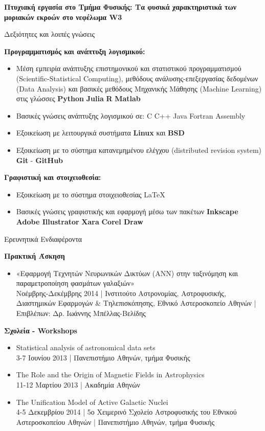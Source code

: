 \documentclass[a4paper,12pt,final]{memoir}
\newcommand{\SmallSep}{\vspace{0.25em}}
\newcommand{\CVSection}[1]
	{\Large{#1}\par
	\SmallSep\normalsize\normalfont}
\newcommand{\CVItem}[2]
	{\textbf{\color{RoyalBlue} #1} #2}
\newcommand{\location}[1]{ %
\small{\color{headings}#1}}
\newenvironment{tightitemize} %
{\vspace{-\topsep}\begin{itemize}\itemsep1pt \parskip0pt \parsep0pt}
{\end{itemize}\vspace{-\topsep}}
\begin{document}
\CVItem{Πτυχιακή εργασία στο Τμήμα Φυσικής: Τα φυσικά χαρακτηριστικά των μοριακών εκροών στο νεφέλωμα W3 \newline}
\location{}
\SmallSep


\CVSection{Δεξιότητες και λοιπές γνώσεις}
\CVItem{Προγραμματισμός και ανάπτυξη λογισμικού:}{}
\begin{tightitemize}
\item Μέση εμπειρία ανάπτυξης επιστημονικού και στατιστικού προγραμματισμού (Scientific-Statistical Computing), μεθόδους ανάλυσης-επεξεργασίας δεδομένων (Data Analysis) και βασικές μεθόδους Μηχανικής Μάθησης (Machine Learning) στις γλώσσες \textbf{Python} \textbullet{} \textbf{Julia} \textbullet{} \textbf{R} \textbullet{} \textbf{Matlab}
\item Βασικές γνώσεις ανάπτυξης λογισμικού σε: C \textbullet{} C++ \textbullet{} Java \textbullet{} Fortran \textbullet{} Assembly 
\item Εξοικείωση με λειτουργικά συστήματα \textbf{Linux} και \textbf{BSD}
\item Εξοικείωση με το σύστημα κατανεμημένου ελέγχου (distributed revision system) \textbf{Git} - \textbf{GitHub}
\end{tightitemize}

\CVItem{Γραφιστική και στοιχειοθεσία:}{}
\begin{tightitemize}
\item Εξοικείωση με το σύστημα στοιχειοθεσίας \LaTeX\
\item Βασικές γνώσεις γραφιστικής και εφαρμογή μέσω των πακέτων \textbf{Inkscape} \textbullet{} \textbf{Adobe Illustrator} \textbullet{} \textbf{Xara} \textbullet{} \textbf{Corel Draw}
\end{tightitemize}
\SmallSep

\CVSection{Ερευνητικά Ενδιαφέροντα}
\CVItem{Πρακτική Άσκηση}{}
\begin{tightitemize}
	\item «Εφαρμογή Τεχνητών Νευρωνικών Δικτύων (ANN) στην ταξινόμηση και παραμετροποίηση φασμάτων γαλαξιών» \\
	\location{Νοέμβρης-Δεκέμβρης 2014 | Ινστιτούτο Αστρονομίας, Αστροφυσικής, Διαστημικών Εφαρμογών \& Τηλεπισκόπησης, Εθνικό Αστεροσκοπείο Αθηνών | Επιβλέπων: Δρ. Ιωάννης Μπέλλας-Βελίδης}
\end{tightitemize}
\CVItem{Σχολεία - Workshops}{}
\begin{tightitemize}
\item Statistical analysis of astronomical data sets \\
\location{3-7 Ιουνίου 2013 | Πανεπιστήμιο Αθηνών, τμήμα Φυσικής}
\item The Role and the Origin of Magnetic Fields in Astrophysics \\
\location{11-12 Μαρτίου 2013 | Ακαδημία Αθηνών}
\item The Unification Model of Active Galactic Nuclei \\
\location{4-5 Δεκεμβρίου 2014 | 5ο Χειμερινό Σχολείο Αστροφυσικής του Εθνικού Αστεροσκοπείου Αθηνών | Πανεπιστήμιο Αθηνών, τμήμα Φυσικής}
\end{tightitemize}
\SmallSep
\end{document}
